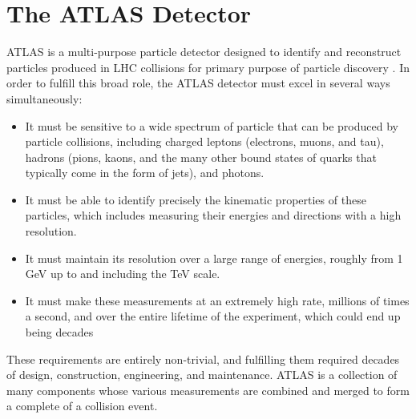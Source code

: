 %
%
%

\section{The ATLAS Detector}
ATLAS is a multi-purpose particle detector designed to identify and reconstruct particles produced in LHC collisions for primary purpose of particle discovery \cite{ATLAS_TDR}.
In order to fulfill this broad role, the ATLAS detector must excel in several ways simultaneously:

\begin{itemize}
  \item It must be sensitive to a wide spectrum of particle that can be produced by particle collisions, including charged leptons (electrons, muons, and tau), hadrons (pions, kaons, and the many other bound states of quarks that typically come in the form of jets), and photons.
  \item It must be able to identify precisely the kinematic properties of these particles, which includes measuring their energies and directions with a high resolution.
  \item It must maintain its resolution over a large range of energies, roughly from 1 GeV up to and including the TeV scale.
  \item It must make these measurements at an extremely high rate, millions of times a second, and over the entire lifetime of the experiment, which could end up being decades
\end{itemize}

These requirements are entirely non-trivial, and fulfilling them required decades of design, construction, engineering, and maintenance.  
ATLAS is a collection of many components whose various measurements are combined and merged to form a complete of a collision event.




